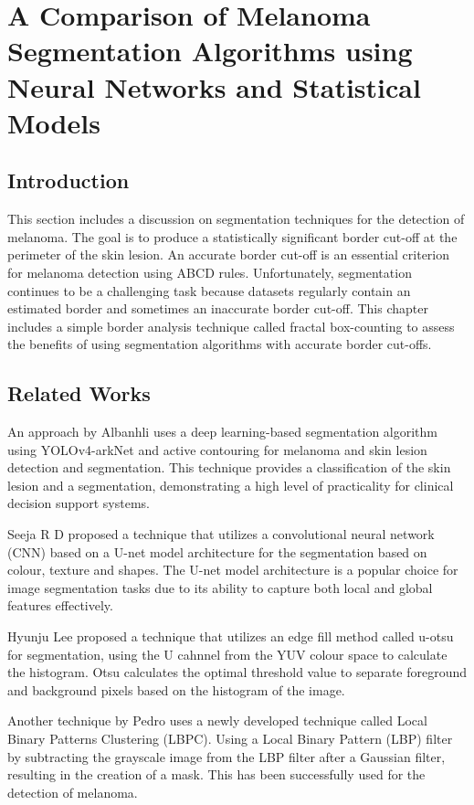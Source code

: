 \chapter{A Comparison of Melanoma Segmentation Algorithms using Neural Networks and Statistical Models}

\section{Introduction}
This section includes a discussion on segmentation techniques for the detection of melanoma. The goal is to produce a statistically significant border cut-off at the perimeter of the skin lesion. An accurate border cut-off is an essential criterion for melanoma detection\cite{Pereira2020, Kaya2016} using ABCD rules. Unfortunately, segmentation continues to be a challenging task because datasets regularly contain an estimated border and sometimes an inaccurate border cut-off. This chapter includes a simple border analysis technique called fractal box-counting to assess the benefits of using segmentation algorithms with accurate border cut-offs.

\section{Related Works}
An approach by Albanhli\cite{Albahli2020} uses a deep learning-based segmentation algorithm using YOLOv4-arkNet and active contouring for melanoma and skin lesion detection and segmentation. This technique provides a classification of the skin lesion and a segmentation, demonstrating a high level of practicality for clinical decision support systems. 

Seeja R D\cite{seeja2019} proposed a technique that utilizes a convolutional neural network (CNN) based on a U-net model architecture for the segmentation based on colour, texture and shapes. The U-net model architecture is a popular choice for image segmentation tasks due to its ability to capture both local and global features effectively.

Hyunju Lee\cite{Lee2020} proposed a technique that utilizes an edge fill method called u-otsu for segmentation, using the U cahnnel from the YUV colour space to calculate the histogram. Otsu calculates the optimal threshold value to separate foreground and background pixels based on the histogram of the image.

Another technique by Pedro\cite{Pereira2020} uses a newly developed technique called Local Binary Patterns Clustering (LBPC). Using a Local Binary Pattern (LBP) filter by subtracting the grayscale image from the LBP filter after a Gaussian filter, resulting in the creation of a mask. This has been successfully used for the detection of melanoma.

